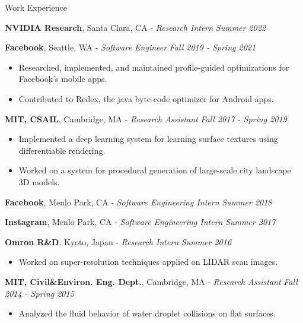 \documentclass{resume}
\begin{document}
\begin{area}{Work Experience}
    \item
        \textbf{NVIDIA Research}, Santa Clara, CA - \emph{Research Intern} \hfill \emph{Summer 2022}
    \item
        \textbf{Facebook}, Seattle, WA - \emph{Software Engineer} \hfill \emph{Fall 2019 - Spring 2021}
        \begin{itemize}
            \item Researched, implemented, and maintained profile-guided optimizations for Facebook's mobile apps.
            \item Contributed to Redex, the java byte-code optimizer for Android apps.
        \end{itemize}
    \item
        \textbf{MIT, CSAIL}, Cambridge, MA - \emph{Research Assistant} \hfill \emph{Fall 2017 - Spring 2019}
        \begin{itemize}
            \item Implemented a deep learning system for learning surface textures using differentiable rendering.
            \item Worked on a system for procedural generation of large-scale city landscape 3D models.
        \end{itemize}
    \item
        \textbf{Facebook}, Menlo Park, CA - \emph{Software Engineering Intern} \hfill \emph{Summer 2018}
    \item
        \textbf{Instagram}, Menlo Park, CA - \emph{Software Engineering Intern} \hfill \emph{Summer 2017}
    \item
        \textbf{Omron R\&D}, Kyoto, Japan - \emph{Research Intern} \hfill \emph{Summer 2016}
        \begin{itemize}
            \item Worked on super-resolution techniques applied on LIDAR scan images.
        \end{itemize}
    \item
        \textbf{MIT, Civil\&Environ. Eng. Dept.}, Cambridge, MA - \emph{Research Assistant} \hfill \emph{Fall 2014 - Spring 2015}
        \begin{itemize}
            \item Analyzed the fluid behavior of water droplet collisions on flat surfaces.
        \end{itemize}
\end{area}
\end{document}
